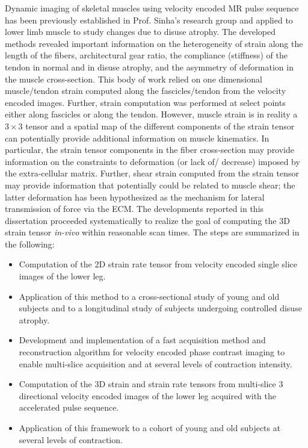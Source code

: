 Dynamic imaging of skeletal muscles using velocity encoded MR pulse sequence has been previously established in Prof. Sinha's research group and applied to lower limb muscle to study changes due to disuse atrophy. 
The developed methods revealed important information on the heterogeneity of strain along the length of the fibers, architectural gear ratio, the compliance (stiffness) of the tendon in normal and in disuse atrophy, and the asymmetry of deformation in the muscle cross-section. 
This body of work relied on one dimensional muscle/tendon strain computed along the fascicles/tendon from the velocity encoded images. 
Further, strain computation was performed at select points either along fascicles or along the tendon. 
However, muscle strain is in reality a $3 \times 3$ tensor and a spatial map of the different components of the strain tensor can potentially provide additional information on muscle kinematics. 
In particular, the strain tensor components in the fiber cross-section may provide information on the constraints to deformation (or lack of/ decrease) imposed by the extra-cellular matrix. 
Further, shear strain computed from the strain tensor may provide information that potentially could be related to muscle shear; the latter deformation has been hypothesized as the mechanism for lateral transmission of force via the ECM. 
The developments reported in this dissertation proceeded systematically to realize the goal of computing the 3D strain tensor \textit{in-vivo} within reasonable scan times. 
The steps are summarized in the following: 
\begin{itemize}
\item Computation of the 2D strain rate tensor from velocity encoded single slice images of the lower leg.
\item Application of this method to a cross-sectional study of young and old subjects and to a longitudinal study of subjects undergoing controlled disuse atrophy.
\item Development and implementation of a fast acquisition method and reconstruction algorithm for velocity encoded phase contrast imaging to enable multi-slice acquisition and at several levels of contraction intensity.
\item Computation of the 3D strain and strain rate tensors from multi-slice 3 directional velocity encoded images of the lower leg acquired with the accelerated pulse sequence.
\item Application of this framework to a cohort of young and old subjects at several levels of contraction.	
\end{itemize}

